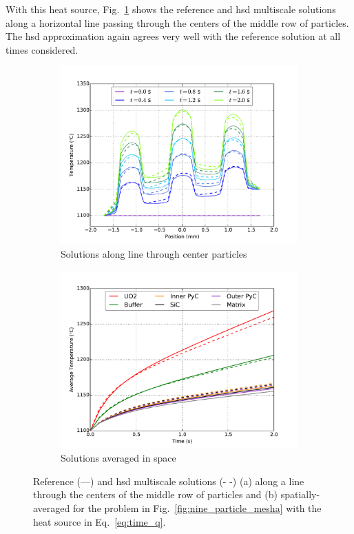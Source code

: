 \noindent With this heat source, Fig.\ \ref{fig:time_q} shows the reference and \gls{hsd} multiscale solutions along a horizontal line passing through the centers of the middle row of particles. The \gls{hsd} approximation again agrees very well with the reference solution at all times considered. 

\begin{figure}[t]
\centering
\begin{subfigure}[b]{0.49\linewidth}
\centering
\includegraphics[width=1.1\linewidth]{figs/nine_particle_center_row_transient.png}
\caption{Solutions along line through center particles}
\label{fig:time_q}
\end{subfigure}
\begin{subfigure}[b]{0.49\linewidth}
\centering
\includegraphics[width=1.1\linewidth]{figs/nine_particle_transient_postprocessors.png}
\caption{Solutions averaged in space}
\label{fig:avg_nine}
\end{subfigure}
\caption{Reference (---) and \gls{hsd} multiscale solutions (- -) (a) along a line through the centers of the middle row of particles and (b) spatially-averaged for the problem in Fig.\ \ref{fig:nine_particle_mesha} with the heat source in Eq.\ \eqref{eq:time_q}.}
\end{figure}

